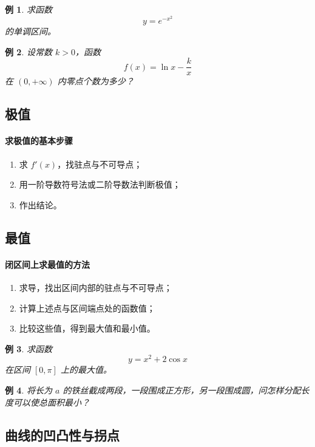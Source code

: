 \documentclass[12pt]{ctexart}
\newtheorem{example}{例}[section]
\theoremstyle{definition}
\begin{document}
\begin{example}
求函数
\[
y=e^{-x^2}
\]
的单调区间。
\end{example}

\begin{example}
设常数 $k>0$，函数
\[
f(x)=\ln x-\frac{k}{x}
\]
在 $(0,+\infty)$ 内零点个数为多少？
\end{example}

\subsection{极值}
\paragraph{求极值的基本步骤}
\begin{enumerate}[label=\arabic*)]
  \item 求 $f'(x)$，找驻点与不可导点；
  \item 用一阶导数符号法或二阶导数法判断极值；
  \item 作出结论。
\end{enumerate}

\subsection{最值}
\paragraph{闭区间上求最值的方法}
\begin{enumerate}[label=\arabic*)]
  \item 求导，找出区间内部的驻点与不可导点；
  \item 计算上述点与区间端点处的函数值；
  \item 比较这些值，得到最大值和最小值。
\end{enumerate}

\begin{example}
求函数
\[
y=x^2+2\cos x
\]
在区间 $[0,\pi]$ 上的最大值。
\end{example}

\begin{example}
将长为 $a$ 的铁丝截成两段，一段围成正方形，另一段围成圆，问怎样分配长度可以使总面积最小？
\end{example}

\subsection{曲线的凹凸性与拐点}
\end{document}
